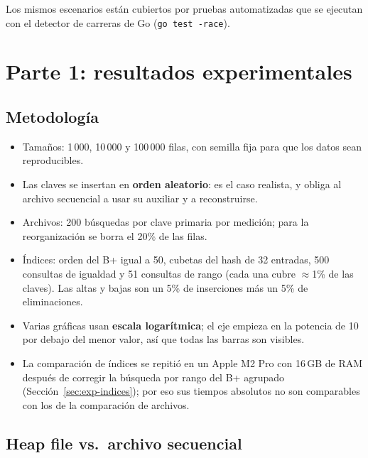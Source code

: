 \documentclass[11pt,a4paper]{article}
\begin{document}
Los mismos escenarios están cubiertos por pruebas automatizadas que se ejecutan con el detector de carreras de Go (\texttt{go test -race}).

\section{Parte 1: resultados experimentales}

\subsection{Metodología}

\begin{itemize}
  \item Tamaños: 1\,000, 10\,000 y 100\,000 filas, con semilla fija para que los datos sean reproducibles.
  \item Las claves se insertan en \textbf{orden aleatorio}: es el caso realista, y obliga al archivo secuencial a usar su auxiliar y a reconstruirse.
  \item Archivos: 200 búsquedas por clave primaria por medición; para la reorganización se borra el 20\% de las filas.
  \item Índices: orden del B+ igual a 50, cubetas del hash de 32 entradas, 500 consultas de igualdad y 51 consultas de rango (cada una cubre $\approx$1\% de las claves). Las altas y bajas son un 5\% de inserciones más un 5\% de eliminaciones.
  \item Varias gráficas usan \textbf{escala logarítmica}; el eje empieza en la potencia de 10 por debajo del menor valor, así que todas las barras son visibles.
  \item La comparación de índices se repitió en un Apple M2 Pro con 16\,GB de RAM después de corregir la búsqueda por rango del B+ agrupado (Sección~\ref{sec:exp-indices}); por eso sus tiempos absolutos no son comparables con los de la comparación de archivos.
\end{itemize}

\subsection{Heap file vs.\ archivo secuencial}
\end{document}
